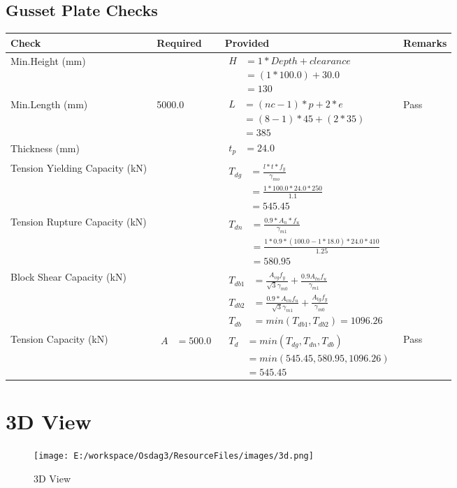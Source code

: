 \documentclass{article}%
\begin{document}
%
\newpage%
\subsection{Gusset Plate Checks}%
\label{subsec:GussetPlateChecks}%
\renewcommand{\arraystretch}{1.2}%
\begin{longtable}{|p{2.5cm}|p{5cm}|p{7.5cm}|p{1cm}|}%
\hline%
\rowcolor{OsdagGreen}%
Check&Required&Provided&Remarks\\%
\hline%
\endhead%
\hline%
Min.Height (mm)&&$\begin{aligned} H &= 1* Depth + clearance \\ &=(1*100.0)+30.0\\ &= 130\end{aligned}$&\\%
\hline%
Min.Length (mm)&5000.0&$\begin{aligned} L &= (nc -1) * p + 2 * e\\ &= (8-1) *45+ (2 *35)\\ &= 385\end{aligned}$&Pass\\%
\hline%
Thickness (mm)&&$\begin{aligned} t_p &=24.0\end{aligned}$&\\%
\hline%
Tension Yielding Capacity (kN)&&$\begin{aligned} T_{dg} &= \frac{l*t*f_y}{\gamma_{mo}}\\ &=\frac{1*100.0*24.0*250}{1.1}\\ &=545.45\end{aligned}$&\\%
\hline%
Tension Rupture Capacity (kN)&&$\begin{aligned} T_{dn} &= \frac{0.9*A_{n}*f_u}{\gamma_{m1}}\\ &=\frac{1*0.9* (100.0-1*18.0)*24.0*410}{1.25}\\ &=580.95\end{aligned}$&\\%
\hline%
Block Shear Capacity (kN)&&$\begin{aligned}T_{db1} &= \frac{A_{vg} f_{y}}{\sqrt{3} \gamma_{m0}} + \frac{0.9 A_{tn} f_{u}}{\gamma_{m1}}\\ T_{db2} &= \frac{0.9*A_{vn} f_{u}}{\sqrt{3} \gamma_{m1}} + \frac{A_{tg} f_{y}}{\gamma_{m0}}\\ T_{db} &= min(T_{db1}, T_{db2})= 1096.26\end{aligned}$&\\%
\hline%
Tension Capacity (kN)&$\begin{aligned} A &=500.0\end{aligned}$&$\begin{aligned} T_d &= min(T_{dg},T_{dn},T_{db})\\ &= min(545.45,580.95,1096.26)\\ &=545.45\end{aligned}$&Pass\\%
\hline%
\end{longtable}

%
%
\newpage%
\section{3D View}%
\label{sec:3DView}%


\begin{figure}[h!]%
\centering%
\texttt{[image: E:/workspace/Osdag3/ResourceFiles/images/3d.png]}%
\caption{3D View}%
\end{figure}

%
\end{document}
